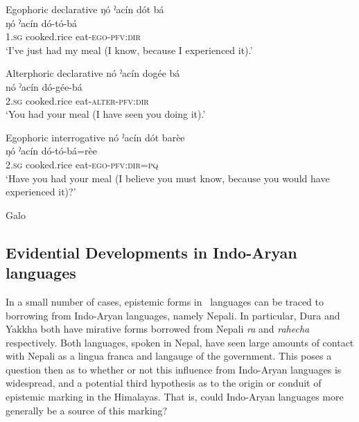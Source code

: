 \begin{exe}
    \ex\label{e:History:Galo}
    \begin{xlist}
    \ex Egophoric declarative
    \glll ŋó ˀacín dót bá \\
    ŋó ˀacín dó-tó-bá \\
    1.\textsc{sg} cooked.rice eat-\textsc{ego-pfv:dir} \\
    \glt `I've just had my meal (I know, because I experienced it).'

    \ex Alterphoric declarative
    \glll nó ˀacín dogée bá \\
    nó ˀacín dó-gée-bá \\
    2.\textsc{sg} cooked.rice eat-\textsc{alter-pfv:dir} \\
    \glt `You had your meal (I have seen you doing it).'

    \ex Egophoric interrogative
    \glll nó ˀacín dót barèe \\
    ŋó ˀacín dó-tó-bá=rèe \\
    2.\textsc{sg} cooked.rice eat-\textsc{ego-pfv:dir=pq} \\
    \glt `Have you had your meal (I believe you must know, because you would have experienced it)?'
    \end{xlist}
    Galo \cite[Tani: India,][114]{Post2013}
\end{exe}


\subsection{Evidential Developments in Indo-Aryan languages}
In a small number of cases, epistemic forms in \lfam\ languages can be traced to borrowing from Indo-Aryan languages, namely Nepali. In particular, Dura \cite[Internal Isolate: Nepal,][279]{Schorer2016} and Yakkha \cite[Kiranti: Nepal,][520]{Schackow2015} both have mirative forms borrowed from Nepali \textit{ra} and \textit{rahecha} respectively. Both languages, spoken in Nepal, have seen large amounts of contact with Nepali as a lingua franca and langauge of the government. This poses a question then as to whether or not this influence from Indo-Aryan languages is widespread, and a potential third hypothesis as to the origin or conduit of epistemic marking in the Himalayas. That is, could Indo-Aryan languages more generally be a source of this marking?

